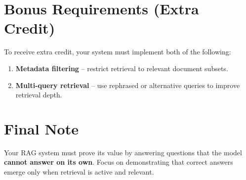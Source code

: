 \documentclass[12pt]{article}
\begin{document}
\section*{Bonus Requirements (Extra Credit)}

To receive extra credit, your system must implement both of the following:

\begin{enumerate}[label=\arabic*.]
  \item \textbf{Metadata filtering} – restrict retrieval to relevant document subsets.
  \item \textbf{Multi-query retrieval} – use rephrased or alternative queries to improve retrieval depth.
\end{enumerate}

\section*{Final Note}

Your RAG system must prove its value by answering questions that the model \textbf{cannot answer on its own}. Focus on demonstrating that correct answers emerge only when retrieval is active and relevant.
\end{document}
